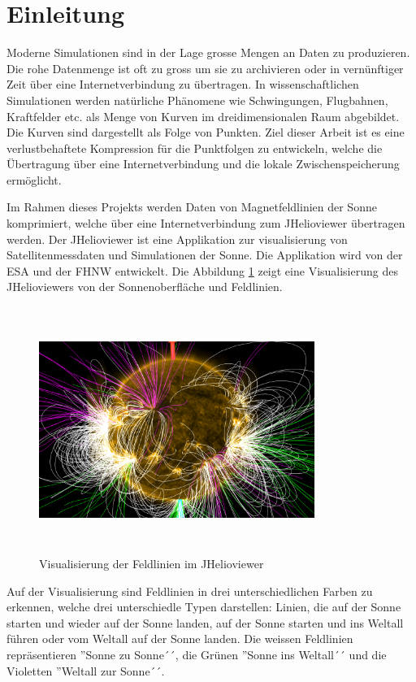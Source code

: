 \section{Einleitung}\label{einleitung}
Moderne Simulationen sind in der Lage grosse Mengen an Daten zu produzieren. Die rohe Datenmenge ist oft zu gross um sie zu archivieren oder in vernünftiger Zeit über eine Internetverbindung zu übertragen. In wissenschaftlichen Simulationen werden natürliche Phänomene wie Schwingungen, Flugbahnen, Kraftfelder etc. als Menge von Kurven im dreidimensionalen Raum abgebildet. Die Kurven sind dargestellt als Folge von Punkten. Ziel dieser Arbeit ist es eine verlustbehaftete Kompression für die Punktfolgen zu entwickeln, welche die Übertragung über eine Internetverbindung und die lokale Zwischenspeicherung ermöglicht.

Im Rahmen dieses Projekts werden Daten von Magnetfeldlinien der Sonne komprimiert, welche über eine Internetverbindung zum JHelioviewer übertragen werden. Der JHelioviewer ist eine Applikation zur visualisierung von Satellitenmessdaten und Simulationen der Sonne. Die Applikation wird von der ESA und der FHNW entwickelt. Die Abbildung \ref{einleitung::feldlinien} zeigt eine Visualisierung des JHelioviewers von der Sonnenoberfläche und Feldlinien.\\
\begin{figure}[!htbp]
\center
	\includegraphics[width=0.8\textwidth,height=8cm,keepaspectratio]{./pictures/einleitung/fieldLines.png}
	\caption{Visualisierung der Feldlinien im JHelioviewer}
	\label{einleitung::feldlinien}
\end{figure}
Auf der Visualisierung sind Feldlinien in drei unterschiedlichen Farben zu erkennen, welche drei unterschiedle Typen darstellen: Linien, die auf der Sonne starten und wieder auf der Sonne landen, auf der Sonne starten und ins Weltall führen oder vom Weltall auf der Sonne landen. Die weissen Feldlinien repräsentieren ''Sonne zu Sonne´´, die Grünen ''Sonne ins Weltall´´ und die Violetten ''Weltall zur Sonne´´.

